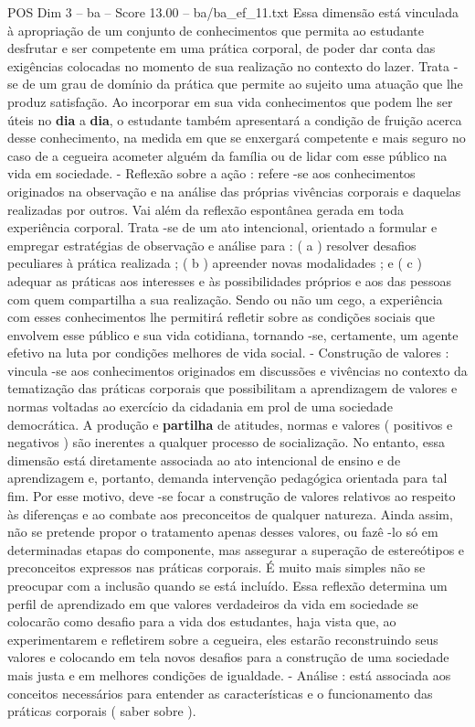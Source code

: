 \begin{textsample}{POS Dim 3 – ba – Score 13.00 – ba/ba\_ef\_11.txt}
Essa dimensão está vinculada à apropriação de um conjunto de conhecimentos que permita ao estudante desfrutar e ser competente em uma prática corporal, de poder dar conta das exigências colocadas no momento de sua realização no contexto do lazer.
Trata -se de um grau de domínio da prática que permite ao sujeito uma atuação que lhe produz satisfação.
Ao incorporar em sua vida conhecimentos que podem lhe ser úteis no \textbf{dia} a \textbf{dia}, o estudante também apresentará a condição de fruição acerca desse conhecimento, na medida em que se enxergará competente e mais seguro no caso de a cegueira acometer alguém da família ou de lidar com esse público na vida em sociedade. - Reflexão sobre a ação : refere -se aos conhecimentos originados na observação e na análise das próprias vivências corporais e daquelas realizadas por outros.
Vai além da reflexão espontânea gerada em toda experiência corporal.
Trata -se de um ato intencional, orientado a formular e empregar estratégias de observação e análise para : ( a ) resolver desafios peculiares à prática realizada ; ( b ) apreender novas modalidades ; e ( c ) adequar as práticas aos interesses e às possibilidades próprios e aos das pessoas com quem compartilha a sua realização.
Sendo ou não um cego, a experiência com esses conhecimentos lhe permitirá refletir sobre as condições sociais que envolvem esse público e sua vida cotidiana, tornando -se, certamente, um agente efetivo na luta por condições melhores de vida social. - Construção de valores : vincula -se aos conhecimentos originados em discussões e vivências no contexto da tematização das práticas corporais que possibilitam a aprendizagem de valores e normas voltadas ao exercício da cidadania em prol de uma sociedade democrática.
A produção e \textbf{partilha} de atitudes, normas e valores ( positivos e negativos ) são inerentes a qualquer processo de socialização.
No entanto, essa dimensão está diretamente associada ao ato intencional de ensino e de aprendizagem e, portanto, demanda intervenção pedagógica orientada para tal fim.
Por esse motivo, deve -se focar a construção de valores relativos ao respeito às diferenças e ao combate aos preconceitos de qualquer natureza.
Ainda assim, não se pretende propor o tratamento apenas desses valores, ou fazê -lo só em determinadas etapas do componente, mas assegurar a superação de estereótipos e preconceitos expressos nas práticas corporais.
É muito mais simples não se preocupar com a inclusão quando se está incluído.
Essa reflexão determina um perfil de aprendizado em que valores verdadeiros da vida em sociedade se colocarão como desafio para a vida dos estudantes, haja vista que, ao experimentarem e refletirem sobre a cegueira, eles estarão reconstruindo seus valores e colocando em tela novos desafios para a construção de uma sociedade mais justa e em melhores condições de igualdade. - Análise : está associada aos conceitos necessários para entender as características e o funcionamento das práticas corporais ( saber sobre ).

\end{textsample}
